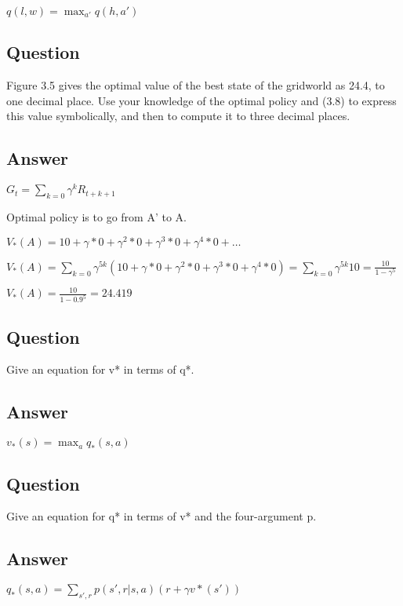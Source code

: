 \documentclass[11pt]{article}
\begin{document}
    $ q(l, w) = \max_{a'} q(h,a') $

    \subsection{Question}

    Figure 3.5 gives the optimal value of the best state of the gridworld as 24.4, to one decimal place.
    Use your knowledge of the optimal policy and (3.8) to express this value symbolically, and then to compute it to three decimal places.

    \subsection*{Answer}

    $G_{t} = \sum_{k=0} \gamma ^ {k} R_{t+k+1} $

    Optimal policy is to go from A' to A.

    $V_{*}(A) = 10 + \gamma*0 + \gamma^{2}*0 + \gamma^{3}*0 + \gamma^{4}*0 + \dots $

    $V_{*}(A) = \sum_{k=0} \gamma^{5k} (10 + \gamma*0 + \gamma^{2}*0 + \gamma^{3}*0 + \gamma^{4}*0) = \sum_{k=0} \gamma^{5k} 10 = \frac{10}{1-\gamma^5}$

    $V_{*}(A) = \frac{10}{1-0.9^5} = 24.419 $

    \subsection{Question}

    Give an equation for v* in terms of q*.

    \subsection*{Answer}

    $ v_{*}(s) = \max_{a} q_{*}(s,a) $

    \subsection{Question}

    Give an equation for q* in terms of v* and the four-argument p.

    \subsection*{Answer}

    $ q_{*}(s, a) = \sum_{s', r} p(s', r | s, a) ( r + \gamma v*(s') ) $
\end{document}
